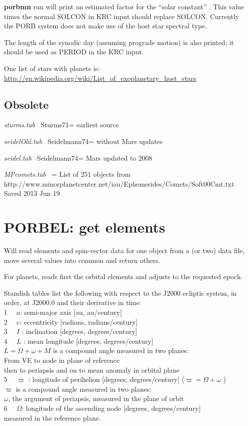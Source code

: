 \documentclass{article}
\newcommand{\np}{\textbf}  %
\newcommand{\qcite}[1]{#1=\cite{#1}}  %
\newcommand{\qi}{\\ \hspace*{2.em}}      %
\newcommand{\qii}{\\ \hspace*{4.em}}     %
\newcommand{\qiii}{\\ \hspace*{6.em}}    %
\begin{document}
\np{porbmn} run will print an estimated factor for the ``solar constant'' . This value times the normal SOLCON in KRC input should replace SOLCON. Currently the PORB system does not make use of the host star spectral type.

The length of the synodic day (assuming prograde motion) is also printed; it should be used as PERIOD in the KRC input. 


One list of stars with planets is: 
\url{http://en.wikipedia.org/wiki/List_of_exoplanetary_host_stars}

\subsection{Obsolete} %

\textit{sturms.tab} \ \qcite{Sturms71} earliest source

\textit{seidelOld.tab} \ \qcite{Seidelmann74}  without Mars updates

\textit{seidel.tab} \ \qcite{Seidelmann74} Mars updated to 2008

\textit{MPcomets.tab} \ \qcite{} List of 251 objects from 
\qi http://www.minorplanetcenter.net/iau/Ephemerides/Comets/Soft00Cmt.txt
\qii Saved 2013 Jun 19 
\section{PORBEL: get elements} %
Will read elements and spin-vector data for one object from a (or two) data file, move several values into common and return others.

For planets, reads first the orbital elements and adjusts to the requested epoch. 

Standish tables list the following with respect to the J2000 ecliptic system, in order, at J2000.0 and their derivative in time:
\qi 1 \ \ $a$: semi-major axis [au, au/century]
\qi 2 \ \ $e$: eccentricity [radians, radians/century]
\qi 3 \ \ $I$ : inclination [degrees, degrees/century]
\qi 4 \ \ $L$ : mean longitude [degrees, degrees/century]
\qii   $L=\Omega +\omega + M$  is a compound angle measured in two planes: 
\qiii From VE to node in plane of reference
\qiii then to periapsis and on to mean anomaly in orbital plane
\qi 5 \ \ $\varpi$ : longitude of perihelion [degrees, degrees/century] ($\varpi= \Omega+ \omega    $ ) 
\qii   $\varpi$ is a compound angle measured in two planes:
\qiii $\omega$, the argument of periapsis, measured in the plane of orbit 
\qi 6 \ \ $\Omega$:  longitude of the ascending node [degrees, degrees/century]
\qii  measured in the reference plane.
\end{document}
